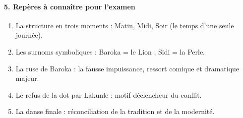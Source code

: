 \documentclass[11pt]{article}
\begin{document}
\begin{exoresolu}
\paragraph{5. Repères à connaître pour l'examen}
\begin{enumerate}
    \item La structure en trois moments : Matin, Midi, Soir (le temps d'une seule journée).
    \item Les surnoms symboliques : Baroka = le Lion ; Sidi = la Perle.
    \item La ruse de Baroka : la fausse impuissance, ressort comique et dramatique majeur.
    \item Le refus de la dot par Lakunle : motif déclencheur du conflit.
    \item La danse finale : réconciliation de la tradition et de la modernité.
\end{enumerate}
\end{exoresolu}
\end{document}
